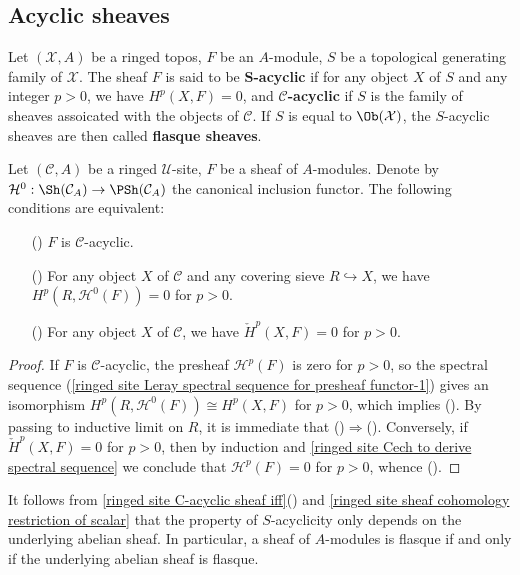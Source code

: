 \subsection{Acyclic sheaves}
Let $(\mathcal{X},A)$ be a ringed topos, $F$ be an $A$-module, $S$ be a topological generating family of $\mathcal{X}$. The sheaf $F$ is said to be \textbf{$\bm{S}$-acyclic} if for any object $X$ of $S$ and any integer $p>0$, we have $H^p(X,F)=0$, and \textbf{$\mathcal{C}$-acyclic} if $S$ is the family of sheaves assoicated with the objects of $\mathcal{C}$. If $S$ is equal to $\Ob(\mathcal{X})$, the $S$-acyclic sheaves are then called \textbf{flasque sheaves}.
\begin{proposition}\label{ringed site C-acyclic sheaf iff}
Let $(\mathcal{C},A)$ be a ringed $\mathscr{U}$-site, $F$ be a sheaf of $A$-modules. Denote by $\mathcal{H}^0:\Sh(\mathcal{C}_A)\to \PSh(\mathcal{C}_A)$ the canonical inclusion functor. The following conditions are equivalent:
\begin{enumerate}
    \item[(\rmnum{1})] $F$ is $\mathcal{C}$-acyclic.
    \item[(\rmnum{2})] For any object $X$ of $\mathcal{C}$ and any covering sieve $R\hookrightarrow X$, we have $H^p(R,\mathcal{H}^0(F))=0$ for $p>0$.
    \item[(\rmnum{3})] For any object $X$ of $\mathcal{C}$, we have $\check{H}^p(X,F)=0$ for $p>0$.
\end{enumerate}
\end{proposition}
\begin{proof}
If $F$ is $\mathcal{C}$-acyclic, the presheaf $\mathcal{H}^p(F)$ is zero for $p>0$, so the spectral sequence (\ref{ringed site Leray spectral sequence for presheaf functor-1}) gives an isomorphism $H^p(R,\mathcal{H}^0(F))\cong H^p(X,F)$ for $p>0$, which implies (). By passing to inductive limit on $R$, it is immediate that ()$\Rightarrow$(). Conversely, if $\check{H}^p(X,F)=0$ for $p>0$, then by induction and \cref{ringed site Cech to derive spectral sequence} we conclude that $\mathcal{H}^p(F)=0$ for $p>0$, whence ().
\end{proof}

It follows from \cref{ringed site C-acyclic sheaf iff}() and \cref{ringed site sheaf cohomology restriction of scalar} that the property of $S$-acyclicity only depends on the underlying abelian sheaf. In particular, a sheaf of $A$-modules is flasque if and only if the underlying abelian sheaf is flasque.

